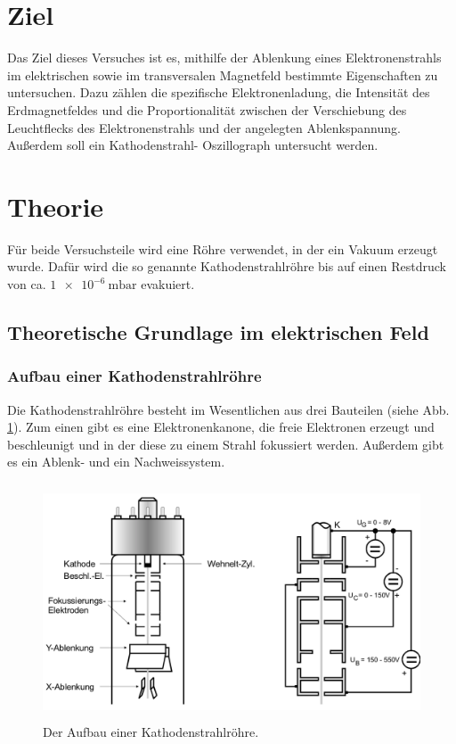 \section{Ziel}
Das Ziel dieses Versuches ist es, mithilfe der Ablenkung
eines Elektronenstrahls im elektrischen sowie im transversalen
Magnetfeld bestimmte Eigenschaften zu untersuchen.
Dazu zählen die spezifische Elektronenladung, die Intensität
des Erdmagnetfeldes und die Proportionalität zwischen der
Verschiebung des Leuchtflecks des Elektronenstrahls und der
angelegten Ablenkspannung. Außerdem soll ein Kathodenstrahl-
Oszillograph untersucht werden.

\section{Theorie}
\label{sec:Theorie}
Für beide Versuchsteile wird eine Röhre verwendet, in der ein
Vakuum erzeugt wurde. Dafür wird die so genannte Kathodenstrahlröhre 
bis auf einen Restdruck von ca. $\SI{1e-6}{\milli\bar}$
evakuiert. 

\subsection{Theoretische Grundlage im elektrischen Feld}

\subsubsection{Aufbau einer Kathodenstrahlröhre}
Die Kathodenstrahlröhre besteht im Wesentlichen aus drei 
Bauteilen (siehe Abb. \ref{fig:roehre}). Zum einen gibt es eine Elektronenkanone, die freie 
Elektronen erzeugt und beschleunigt und in der diese zu einem 
Strahl fokussiert werden. Außerdem gibt es ein Ablenk- und 
ein Nachweissystem.
\begin{figure}
    \centering
    \includegraphics[width=12cm, height=7cm]{build/roehre.png}
    \caption{Der Aufbau einer Kathodenstrahlröhre. \cite{V501}}
    \label{fig:roehre}
\end{figure}

